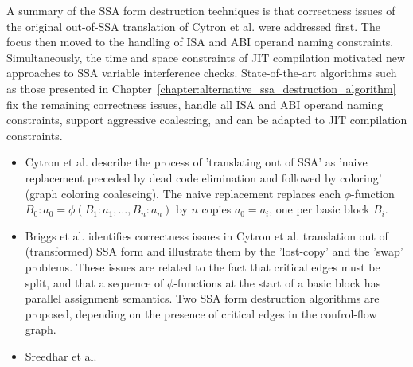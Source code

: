 A summary of the SSA form destruction techniques is that correctness issues of
the original out-of-SSA translation of Cytron et al. \cite{Cytron} were
addressed first. The focus then moved to the handling of ISA and
ABI operand naming constraints. Simultaneously, the time and space constraints of
JIT compilation motivated new approaches to SSA variable interference checks.
State-of-the-art algorithms such as those presented in
Chapter~\ref{chapter:alternative_ssa_destruction_algorithm} fix the remaining
correctness issues, handle all ISA and ABI operand naming constraints, support
aggressive coalescing, and can be adapted to JIT compilation constraints.
\begin{itemize}

\item Cytron et al. \cite{Cytron} describe the process of 'translating out of
SSA' as 'naive replacement preceded by dead code elimination and followed by
coloring' (graph coloring coalescing). The naive replacement replaces
each $\phi$-function $B_0:a_0=\phi(B_1:a_1,\dots,B_n:a_n)$ by $n$ copies $a_0 = a_i$,
one per basic block $B_i$.

\item Briggs et al. \cite{bib:briggs.ea-98} identifies correctness issues in
Cytron et al. translation out of (transformed) SSA form and illustrate them by
the 'lost-copy' and the 'swap' problems. These issues are related to the fact
that critical edges must be split, and that a sequence of $\phi$-functions at
the start of a basic block has parallel assignment semantics. Two SSA form
destruction algorithms are proposed, depending on the presence of critical edges
in the confrol-flow graph.

\item Sreedhar et al. \cite{SreedharSep99} 

\end{itemize}


